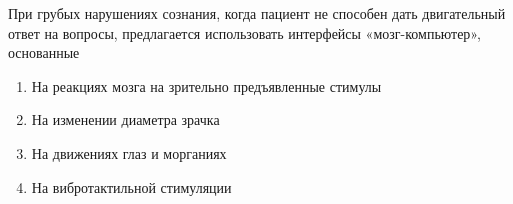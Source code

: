 
При грубых нарушениях сознания, когда пациент не способен дать двигательный ответ на вопросы, предлагается использовать интерфейсы «мозг-компьютер», основанные

\begin{enumerate}
    \item На реакциях мозга на зрительно предъявленные стимулы
    \item На изменении диаметра зрачка
    \item На движениях глаз и морганиях
    \item На вибротактильной стимуляции
\end{enumerate}